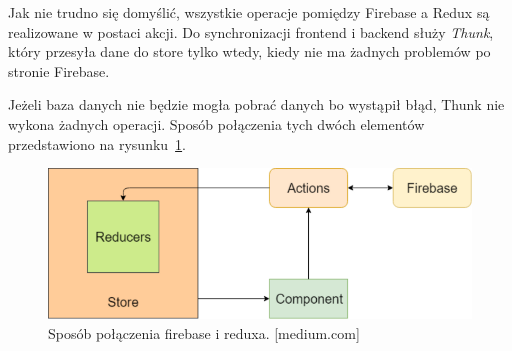 Jak nie trudno się domyślić, wszystkie operacje pomiędzy Firebase a Redux są realizowane w postaci akcji.
Do synchronizacji frontend i backend służy \textit{Thunk},
który przesyła dane do store tylko wtedy,
kiedy nie ma żadnych problemów po stronie Firebase.

Jeżeli baza danych nie będzie mogła pobrać danych bo wystąpił błąd,
Thunk nie wykona żadnych operacji. Sposób połączenia tych dwóch elementów przedstawiono
na rysunku~\ref{rys:fireRedux}.

\begin{figure}
	\centering\includegraphics[width=.6\textwidth]{img/fireRedux.png}
	\caption{Sposób połączenia firebase i reduxa. [medium.com]}\label{rys:fireRedux}%
\end{figure}

